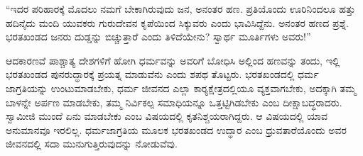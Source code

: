  “ಇದರ ಪರಿಹಾರಕ್ಕೆ ಮೊದಲು ನಮಗೆ ಬೇಕಾಗಿರುವುದು ಜನ, ಅನಂತರ ಹಣ. ಪ್ರತಿಯೊಂದು ಊರಿನಿಂದಲೂ ಹತ್ತು ಹದಿನೈದು ಮಂದಿ ಯುವಕರು ಗುರುದೇವನ ಕೃಪೆಯಿಂದ ಸಿಕ್ಕುವರು ಎಂದು ಭಾವಿಸಿದ್ದೆನು. ಅನಂತರ ಹಣದ ಪ್ರಶ್ನೆ. ಭರತಖಂಡದ ಜನರು ದುಡ್ಡನ್ನು ಬಿಚ್ಚುತ್ತಾರೆ ಎಂದು ತಿಳಿದೆಯೇನು? ಸ್ವಾರ್ಥ ಮೂರ್ತಿಗಳು ಅವರು!” 

 ಆದಕಾರಣವೆ ಪಾಶ್ಚಾತ್ಯ ದೇಶಗಳಿಗೆ ಹೋಗಿ ಧರ್ಮವನ್ನು ಅವರಿಗೆ ಬೋಧಿಸಿ ಅಲ್ಲಿಂದ ಹಣವನ್ನು ತಂದು, ಇಲ್ಲಿ ಭರತಖಂಡದ ಪುನರುದ್ಧಾರಕ್ಕೆ ಪ್ರಯತ್ನ ಮಾಡುವೆನು ಎಂದು ಶಪಥ ತೊಟ್ಟರು. ಭರತಖಂಡದಲ್ಲಿ ಧರ್ಮ ಜಾಗ್ರತಿಯನ್ನು ಉಂಟುಮಾಡಬೇಕು, ಧರ್ಮ ಜೀವನದ ಎಲ್ಲಾ ಕಾರ‍್ಯಕ್ಷೇತ್ರದಲ್ಲಿಯೂ ವ್ಯಕ್ತವಾಗಬೇಕು, ಅದಕ್ಕಾಗಿ ತಮ್ಮ ಬಾಳನ್ನೇ ಅರ್ಪಣ ಮಾಡಬೇಕು, ತಮ್ಮ ನಿರ್ವಿಕಲ್ಪ ಸಮಾಧಿಯನ್ನೂ ಒತ್ತಟ್ಟಿಗಿಡಬೇಕು ಎಂಬ ದೀಕ್ಷಾಬದ್ಧರಾದರು. ಸ್ವಾಮೀಜಿ ಮುಂದೆ ಏನು ಮಾಡಬೇಕು ಎಂಬ ವಿಷಯದಲ್ಲಿ ಕೃತನಿಶ್ಚಯರಾಗಿದ್ದರು. ಆ ವಿಷಯದಲ್ಲಿ ಯಾವ ಅನುಮಾನವೂ ಇರಲಿಲ್ಲ. ಧರ್ಮಜಾಗ್ರತಿಯ ಮೂಲಕ ಭರತಖಂಡದ ಉದ್ಧಾರ ಎಂಬ ಧ್ರುವತಾರೆಯೊಂದು ಅವರ ಜೀವನದಲ್ಲಿ ಸದಾ ಮುನುಗುತ್ತಿರುವುದನ್ನು ನೋಡುವೆವು. 


